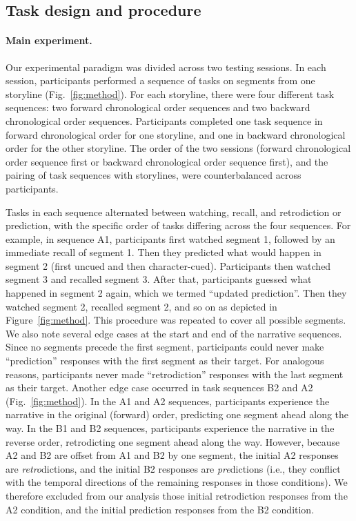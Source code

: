 \documentclass[10pt]{article}
\begin{document}
\subsection*{Task design and procedure}

\paragraph{Main experiment.} Our experimental paradigm was divided across two testing sessions. In each session, participants performed a sequence of tasks on segments from one storyline (Fig.~\ref{fig:method}). For each storyline, there were four different task sequences: two forward chronological order sequences and two backward chronological order sequences. Participants completed one task sequence in forward chronological order for one storyline, and one in backward chronological order for the other storyline. The order of the two sessions (forward chronological order sequence first or backward chronological order sequence first), and the pairing of task sequences with storylines, were counterbalanced across participants.

Tasks in each sequence alternated between watching, recall, and retrodiction or prediction, with the specific order of tasks differing across the four sequences. For example, in sequence A1, participants first watched segment 1, followed by an immediate recall of segment 1. Then they predicted what would happen in segment 2 (first uncued and then character-cued). Participants then watched segment 3 and recalled segment 3. After that, participants guessed what happened in segment 2 again, which we termed ``updated prediction''. Then they watched segment 2, recalled segment 2, and so on as depicted in Figure~\ref{fig:method}. This procedure was repeated to cover all possible segments. We also note several edge cases at the start and end of the narrative sequences. Since no segments precede the first segment, participants could never make ``prediction'' responses with the first segment as their target. For analogous reasons, participants never made ``retrodiction'' responses with the last segment as their target. Another edge case occurred in task sequences B2 and A2 (Fig.~\ref{fig:method}). In the A1 and A2 sequences, participants experience the narrative in the original (forward) order, predicting one segment ahead along the way. In the B1 and B2 sequences, participants experience the narrative in the reverse order, retrodicting one segment ahead along the way. However, because A2 and B2 are offset from A1 and B2 by one segment, the initial A2 responses are \textit{retro}dictions, and the initial B2 responses are \textit{pre}dictions (i.e., they conflict with the temporal directions of the remaining responses in those conditions). We therefore excluded from our analysis those initial retrodiction responses from the A2 condition, and the initial prediction responses from the B2 condition.
\end{document}
